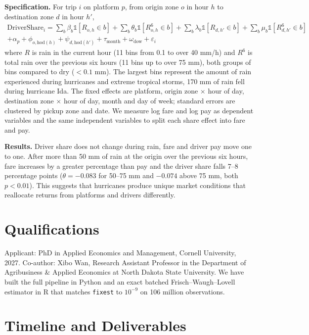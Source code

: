 \documentclass[11pt]{article}
\begin{document}
\textbf{Specification.} For trip $i$ on platform $p$, from origin zone $o$ in hour $h$ to destination zone $d$ in hour $h'$,
\begin{multline}
\text{DriverShare}_i = \sum_{b} \beta_b \mathbb{1}[R_{o,h} \in b] + \sum_{b} \theta_b \mathbb{1}[R^{6}_{o,h} \in b] + \sum_{b} \lambda_b \mathbb{1}[R_{d,h'} \in b] + \sum_{b} \mu_b \mathbb{1}[R^{6}_{d,h'} \in b] \\
+ \alpha_p + \phi_{o,\text{hod}(h)} + \psi_{d,\text{hod}(h')} + \tau_{\text{month}} + \omega_{\text{dow}} + \varepsilon_i
\end{multline}
where $R$ is rain in the current hour (11 bins from 0.1 to over 40 mm/h) and $R^{6}$ is total rain over the previous six hours (11 bins up to over 75 mm), both groups of bins compared to dry ($<0.1$ mm). The largest bins represent the amount of rain experienced during hurricanes and extreme tropical storms, 170 mm of rain fell during hurricane Ida. The fixed effects are platform, origin zone $\times$ hour of day, destination zone $\times$ hour of day, month and day of week; standard errors are clustered by pickup zone and date. We measure log fare and log pay as dependent variables and the same independent variables to split each share effect into fare and pay.

\textbf{Results.} Driver share does not change during rain, fare and driver pay move one to one. After more than 50 mm of rain at the origin over the previous six hours, fare increases by a greater percentage than pay and the driver share falls 7--8 percentage points ($\theta = -0.083$ for 50--75 mm and $-0.074$ above 75 mm, both $p<0.01$). This suggests that hurricanes produce unique market conditions that reallocate returns from platforms and drivers differently.

\section{Qualifications}

Applicant: PhD in Applied Economics and Management, Cornell University, 2027. Co-author: Xibo Wan, Research Assistant Professor in the Department of Agribusiness \& Applied Economics at North Dakota State University. We have built the full pipeline in Python and an exact batched Frisch--Waugh--Lovell estimator in R that matches \texttt{fixest} to $10^{-9}$ on 106 million observations.

\section{Timeline and Deliverables}
\end{document}
